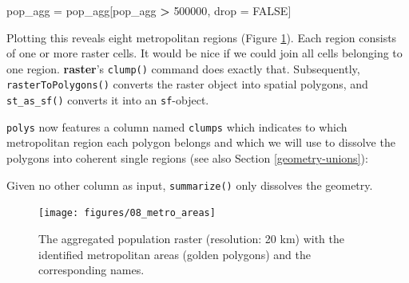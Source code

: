 \documentclass[]{krantz}
\newenvironment{Shaded}{\begin{snugshade}}{\end{snugshade}}
\newcommand{\DecValTok}[1]{\textcolor[rgb]{0.06,0.06,0.06}{#1}}
\newcommand{\KeywordTok}[1]{\textcolor[rgb]{0.27,0.27,0.27}{\textbf{#1}}}
\newcommand{\NormalTok}[1]{#1}
\newcommand{\OperatorTok}[1]{\textcolor[rgb]{0.43,0.43,0.43}{\textbf{#1}}}
\newcommand{\OtherTok}[1]{\textcolor[rgb]{0.37,0.37,0.37}{#1}}
\newcommand{\StringTok}[1]{\textcolor[rgb]{0.5,0.5,0.5}{#1}}
\begin{document}
\begin{Shaded}
\begin{Highlighting}[]
\NormalTok{pop_agg =}\StringTok{ }\NormalTok{pop_agg[pop_agg }\OperatorTok{>}\StringTok{ }\DecValTok{500000}\NormalTok{, drop =}\StringTok{ }\OtherTok{FALSE}\NormalTok{] }
\end{Highlighting}
\end{Shaded}

Plotting this reveals eight metropolitan regions (Figure \ref{fig:metro-areas}).
Each region consists of one or more raster cells.
It would be nice if we could join all cells belonging to one region.
\textbf{raster}'s \texttt{clump()} command does exactly that.
Subsequently, \texttt{rasterToPolygons()} converts the raster object into spatial polygons, and \texttt{st\_as\_sf()} converts it into an \texttt{sf}-object.

\begin{Shaded}
\end{Shaded}

\texttt{polys} now features a column named \texttt{clumps} which indicates to which metropolitan region each polygon belongs and which we will use to dissolve the polygons into coherent single regions (see also Section \ref{geometry-unions}):

\begin{Shaded}
\end{Shaded}

Given no other column as input, \texttt{summarize()} only dissolves the geometry.

\begin{figure}[t]

{\centering \texttt{[image: figures/08\_metro\_areas]} 

}

\caption[The aggregated population raster.]{The aggregated population raster (resolution: 20 km) with the identified metropolitan areas (golden polygons) and the corresponding names.}\label{fig:metro-areas}
\end{figure}
\end{document}
